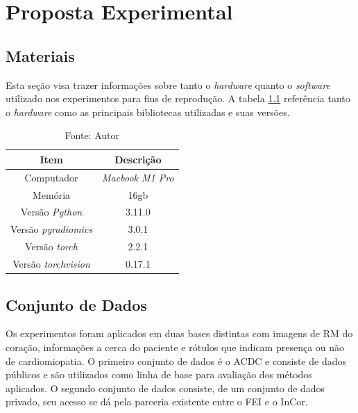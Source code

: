 \chapter{Proposta Experimental}
\label{chap:proposta}

\section{Materiais} 
\label{sec:cap5_materiais}

Esta seção visa trazer informações sobre tanto o \textit{hardware} quanto o \textit{software} utilizado nos experimentos para fins de reprodução. A tabela \ref{tab:hardware_software} referência tanto o \textit{hardware} como as principais bibliotecas utilizadas e suas versões.

\begin{table}[hbtp]
    \centering
    \renewcommand{\arraystretch}{1} %
    \begin{tabular}{|c|c|}
    \hline 
       \textbf{Item} & \textbf{Descrição}\\
    \hline 
       Computador & \textit{Macbook M1 Pro}  \\
    \hline 
       Memória & 16gb  \\
    \hline 
       Versão \textit{Python} & 3.11.0  \\
    \hline 
       Versão \textit{pyradiomics} & 3.0.1 \\
    \hline 
       Versão \textit{torch} & 2.2.1 \\
    \hline 
       Versão \textit{torchvision} & 0.17.1 \\
    \hline 
    \end{tabular} 
    \caption{Fonte: Autor}
    \label{tab:hardware_software}
\end{table}





\section{Conjunto de Dados} 
\label{sec:cap5_conj_dados}

Os experimentos foram  aplicados em duas bases distintas com imagens de RM do coração, informações a cerca do paciente e rótulos que indicam presença ou não de cardiomiopatia. O primeiro conjunto de dados é o ACDC e consiste de dados públicos e são utilizados como linha de base para avaliação dos métodos aplicados. O segundo conjunto de dados consiste, de um conjunto de dados privado, seu acesso
se dá pela parceria existente entre o \gls{FEI} e o \gls{InCor}.

